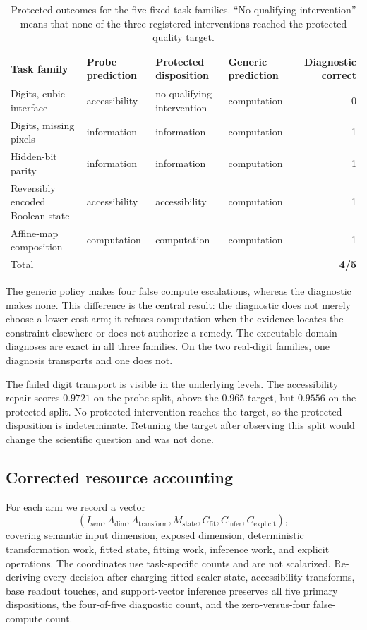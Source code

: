 \documentclass[10pt]{article}
\begin{document}
\begin{table}[t]
\centering
\small
\caption{Protected outcomes for the five fixed task families. ``No qualifying intervention'' means that none of the three registered interventions reached the protected quality target.}
\label{tab:primary}
\begin{tabularx}{\textwidth}{>{\raggedright\arraybackslash}X l l l r}
\toprule
Task family & Probe prediction & Protected disposition & Generic prediction & Diagnostic correct \\
\midrule
Digits, cubic interface & accessibility & no qualifying intervention & computation & 0 \\
Digits, missing pixels & information & information & computation & 1 \\
Hidden-bit parity & information & information & computation & 1 \\
Reversibly encoded Boolean state & accessibility & accessibility & computation & 1 \\
Affine-map composition & computation & computation & computation & 1 \\
\midrule
Total & & & & \textbf{4/5} \\
\bottomrule
\end{tabularx}
\end{table}

The generic policy makes four false compute escalations, whereas the diagnostic makes none. This difference is the central result: the diagnostic does not merely choose a lower-cost arm; it refuses computation when the evidence locates the constraint elsewhere or does not authorize a remedy. The executable-domain diagnoses are exact in all three families. On the two real-digit families, one diagnosis transports and one does not.

The failed digit transport is visible in the underlying levels. The accessibility repair scores $0.9721$ on the probe split, above the $0.965$ target, but $0.9556$ on the protected split. No protected intervention reaches the target, so the protected disposition is indeterminate. Retuning the target after observing this split would change the scientific question and was not done.

\subsection{Corrected resource accounting}
\label{sec:accounting}

For each arm we record a vector
\[
(I_{\mathrm{sem}},A_{\mathrm{dim}},A_{\mathrm{transform}},M_{\mathrm{state}},C_{\mathrm{fit}},C_{\mathrm{infer}},C_{\mathrm{explicit}}),
\]
covering semantic input dimension, exposed dimension, deterministic transformation work, fitted state, fitting work, inference work, and explicit operations. The coordinates use task-specific counts and are not scalarized. Re-deriving every decision after charging fitted scaler state, accessibility transforms, base readout touches, and support-vector inference preserves all five primary dispositions, the four-of-five diagnostic count, and the zero-versus-four false-compute count.
\end{document}
